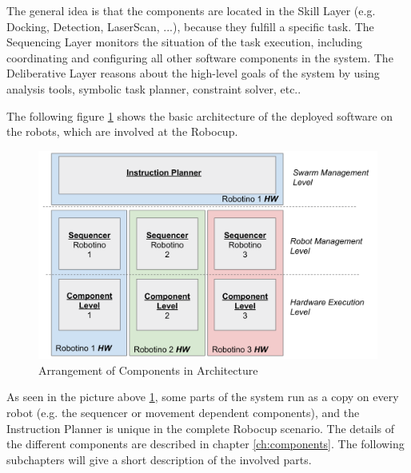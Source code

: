 The general idea is that the components are located in the Skill Layer (e.g. Docking, Detection, LaserScan, ...), because they fulfill a specific task. The Sequencing Layer monitors the situation of the task execution, including coordinating and configuring all other software components in the system. The Deliberative Layer reasons about the high-level goals of the system by using analysis tools, symbolic task planner, constraint solver, etc..

The following figure \ref{fig:architecture_overview} shows the basic architecture of the deployed software on the robots, which are involved at the Robocup. \\

\begin{figure}[h]
\centering
\includegraphics[scale=0.23]{pic/architecture2018.png}
\caption{Arrangement of Components in Architecture}
\label{fig:architecture_overview}
\end{figure}

As seen in the picture above \ref{fig:architecture_overview}, some parts of the system run as a copy on every robot (e.g. the sequencer or movement dependent components), and the Instruction Planner is unique in the complete Robocup scenario. The details of the different components are described in chapter \ref{ch:components}. The following subchapters will give a short description of the involved parts.

